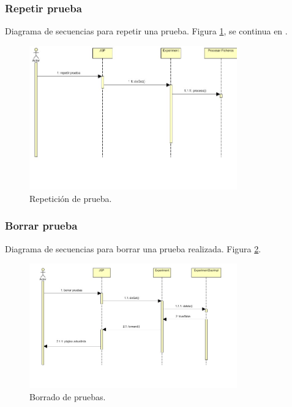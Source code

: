 \subsubsection{Repetir prueba}
Diagrama de secuencias para repetir una prueba. Figura \ref{repprueba}, se continua en .
\begin{figure}[!htbp]
  \centering
    \includegraphics[width=0.8\textwidth]{../img/diagramas/secuencias/13.jpg}
  \caption{Repetición de prueba.}
  \label{repprueba}
\end{figure}

\subsubsection{Borrar prueba}
Diagrama de secuencias para borrar una prueba realizada. Figura \ref{borradoprueba}.
\begin{figure}[!htbp]
  \centering
    \includegraphics[width=0.8\textwidth]{../img/diagramas/secuencias/12.jpg}
  \caption{Borrado de pruebas.}
  \label{borradoprueba}
\end{figure}

